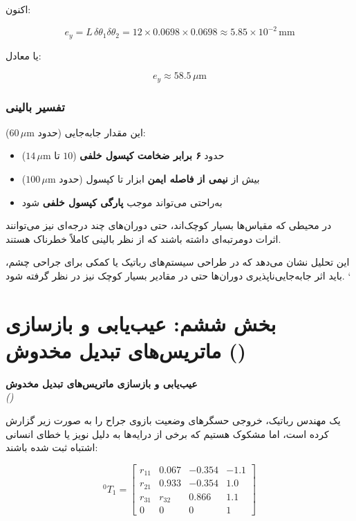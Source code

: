 \documentclass{article}
\begin{document}
اکنون:

\[
e_y = L\,\delta\theta_1\delta\theta_2
= 12\times 0.0698 \times 0.0698
\approx 5.85\times 10^{-2}\,\text{mm}
\]

یا معادل:

\[
e_y \approx 58.5\,\mu\text{m}
\]

\subsubsection{تفسیر بالینی}

این مقدار جابه‌جایی (حدود $60\,\mu\text{m}$):

\begin{itemize}
	\item حدود \textbf{۶ برابر ضخامت کپسول خلفی} ($10$ تا $14\,\mu\text{m}$)
	\item بیش از \textbf{نیمی از فاصله ایمن} ابزار تا کپسول (حدود $100\,\mu\text{m}$)
	\item به‌راحتی می‌تواند موجب \textbf{پارگی کپسول خلفی} شود  
\end{itemize}

در محیطی که مقیاس‌ها بسیار کوچک‌اند، حتی دوران‌های چند درجه‌ای نیز می‌توانند اثرات دومرتبه‌ای داشته باشند که از نظر بالینی کاملاً خطرناک هستند.

این تحلیل نشان می‌دهد که در طراحی سیستم‌های رباتیک یا کمکی برای جراحی چشم، باید اثر جابه‌جایی‌ناپذیری دوران‌ها حتی در مقادیر بسیار کوچک نیز در نظر گرفته شود.
`

\newpage
\section{بخش ششم: عیب‌یابی و بازسازی ماتریس‌های تبدیل مخدوش 
	()}


\textbf{عیب‌یابی و بازسازی ماتریس‌های تبدیل مخدوش} \\
\textit{()}

یک مهندس رباتیک، خروجی حسگرهای وضعیت بازوی جراح را به صورت زیر گزارش کرده است، اما مشکوک هستیم که برخی از درایه‌ها به دلیل نویز یا خطای انسانی اشتباه ثبت شده باشند:

\[
^{0}T_{1} =
\begin{bmatrix}
	r_{11} & 0.067 & -0.354 & -1.1 \\
	r_{21} & 0.933 & -0.354 & 1.0 \\
	r_{31} & r_{32} & 0.866 & 1.1 \\
	0 & 0 & 0 & 1
\end{bmatrix}
\]
\end{document}
